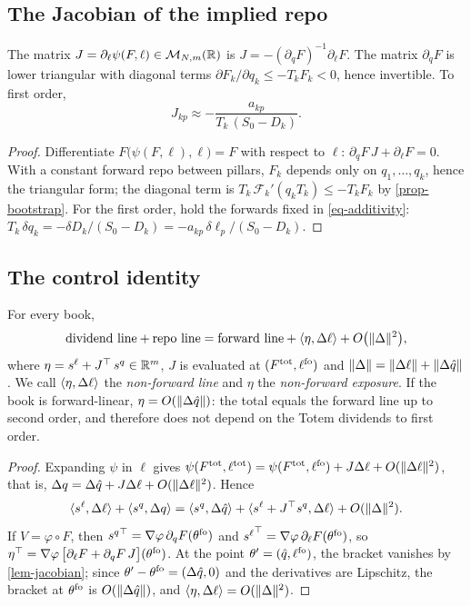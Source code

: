 \subsection{The Jacobian of the implied repo}
\begin{lemma}[Jacobian]\label{lem-jacobian}
The matrix $J=\partial_\ell\psi(F, \ell)\in\mathcal{M}_{N,m}(\mathbb{R})$ is $J=-(\partial_qF)^{-1}\partial_\ell F$. The matrix
$\partial_qF$ is lower triangular with diagonal terms $\partial F_k/\partial q_k\le-T_kF_k<0$, hence invertible. To first
order,
\begin{equation}\label{eq-jacobian}
J_{kp}\approx-\frac{a_{kp}}{T_k\,(S_0-D_k)} .
\end{equation}
\end{lemma}
\begin{proof}
Differentiate $F\bigl(\psi(F, \ell), \ell\bigr)=F$ with respect to $\ell$: $\partial_qF\,J+\partial_\ell F=0$. With a
constant forward repo between pillars, $F_k$ depends only on $q_1, \dots, q_k$, hence the triangular form; the diagonal
term is $T_k\,\mathcal F_k'(q_kT_k)\le-T_kF_k$ by \cref{prop-bootstrap}. For the first order, hold the forwards fixed in
\eqref{eq-additivity}: $T_k\,\delta q_k=-\delta D_k/(S_0-D_k)=-a_{kp}\,\delta\ell_p/(S_0-D_k)$.
\end{proof}

\subsection{The control identity}
\begin{theorem}\label{thm-control}
For every book,
\begin{equation}\label{eq-control}
\text{dividend line}+\text{repo line}=\text{forward line}+\langle \eta, \Delta\ell\rangle+O\bigl(\lVert \Delta\rVert^2\bigr),
\end{equation}
where $\eta=s^\ell+{J}^{\top}\,s^q\in\mathbb{R}^m$, $J$ is evaluated at $(F^{\mathrm{tot}}, \ell^{\mathrm{fo}})$ and
$\lVert \Delta\rVert=\lVert \Delta\ell\rVert+\lVert \Delta\hat q\rVert$. We call $\langle \eta, \Delta\ell\rangle$ the \emph{non-forward line}
and $\eta$ the \emph{non-forward exposure}. If the book is forward-linear, $\eta=O(\lVert \Delta\hat q\rVert)$: the total
equals the forward line up to second order, and therefore does not depend on the Totem dividends to first order.
\end{theorem}
\begin{proof}
Expanding $\psi$ in $\ell$ gives $\psi(F^{\mathrm{tot}}, \ell^{\mathrm{tot}})=\psi(F^{\mathrm{tot}}, \ell^{\mathrm{fo}})+J\Delta\ell
+O(\lVert \Delta\ell\rVert^2)$, that is, $\Delta q=\Delta\hat q+J\Delta\ell+O(\lVert \Delta\ell\rVert^2)$. Hence
\[
\langle s^\ell, \Delta\ell\rangle+\langle s^q, \Delta q\rangle=\langle s^q, \Delta\hat q\rangle+\langle s^\ell+{J}^{\top}s^q, \Delta\ell\rangle
+O(\lVert \Delta\rVert^2).
\]
If $V=\varphi\circ F$, then ${s^q}^{\top}=\nabla\varphi\,\partial_qF(\theta^{\mathrm{fo}})$ and
${s^\ell}^{\top}=\nabla\varphi\,\partial_\ell F(\theta^{\mathrm{fo}})$, so
${\eta}^{\top}=\nabla\varphi\,\bigl[\partial_\ell F+\partial_qF\,J\bigr](\theta^{\mathrm{fo}})$. At the point
$\theta'=(\hat q, \ell^{\mathrm{fo}})$, the bracket vanishes by \cref{lem-jacobian}; since $\theta'-\theta^{\mathrm{fo}}=(\Delta\hat q, 0)$
and the derivatives are Lipschitz, the bracket at $\theta^{\mathrm{fo}}$ is $O(\lVert \Delta\hat q\rVert)$, and
$\langle \eta, \Delta\ell\rangle=O(\lVert \Delta\rVert^2)$.
\end{proof}

